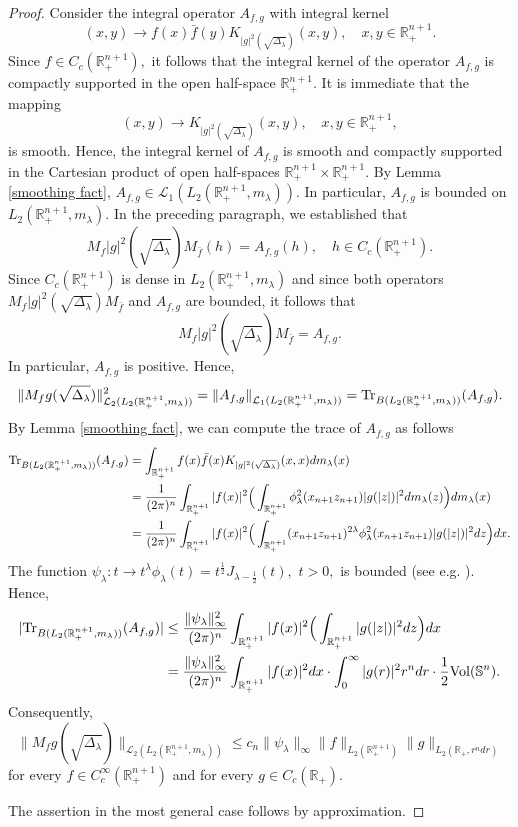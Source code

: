 \documentclass{amsart}
\begin{document}
\begin{proof}
Consider the integral operator $A_{f,g}$ with integral kernel
$$(x,y)\to f(x)\bar{f}(y)K_{|g|^2(\sqrt{\Delta_{\lambda}})}(x,y),\quad x,y\in\mathbb{R}^{n+1}_+.$$
Since $f\in C_c(\mathbb{R}^{n+1}_+),$ it follows that the integral kernel of the operator $A_{f,g}$ is compactly supported in the open half-space $\mathbb{R}^{n+1}_+.$ It is immediate that the mapping
$$(x,y)\to K_{|g|^2(\sqrt{\Delta_{\lambda}})}(x,y),\quad x,y\in\mathbb{R}^{n+1}_+,$$
is smooth. Hence, the integral kernel of $A_{f,g}$ is smooth and compactly supported in the Cartesian product of open half-spaces $\mathbb{R}^{n+1}_+\times\mathbb{R}^{n+1}_+.$ By Lemma \ref{smoothing fact}, $A_{f,g}\in\mathcal{L}_1(L_2(\mathbb{R}^{n+1}_+,m_{\lambda})).$ In particular, $A_{f,g}$ is bounded on $L_2(\mathbb{R}^{n+1}_+,m_{\lambda}).$ In the preceding paragraph, we established that
$$M_f|g|^2(\sqrt{\Delta_{\lambda}})M_{\bar{f}}(h)=A_{f,g}(h),\quad h\in C_c(\mathbb{R}_+^{n+1}).$$
Since $C_c(\mathbb{R}_+^{n+1})$ is dense in $L_2(\mathbb{R}^{n+1}_+,m_{\lambda})$ and since both operators $M_f|g|^2(\sqrt{\Delta_{\lambda}})M_{\bar{f}}$ and $A_{f,g}$ are bounded, it follows that
$$M_f|g|^2(\sqrt{\Delta_{\lambda}})M_{\bar{f}}=A_{f,g}.$$
In particular, $A_{f,g}$ is positive. Hence,
$$\|M_fg(\sqrt{\Delta_{\lambda}})\|_{\mathcal{L}_2(L_2(\mathbb{R}_+^{n+1},m_{\lambda}))}^2=\|A_{f,g}\|_{\mathcal{L}_1(L_2(\mathbb{R}_+^{n+1},m_{\lambda}))}={\rm Tr}_{B(L_2(\mathbb{R}^{n+1}_+,m_{\lambda}))}(A_{f,g}).$$
By Lemma \ref{smoothing fact}, we can compute the trace of $A_{f,g}$ as follows
\begin{align*}
{\rm Tr}_{B(L_2(\mathbb{R}^{n+1}_+,m_{\lambda}))}(A_{f,g})&=\int_{\mathbb{R}_+^{n+1}}f(x)\bar{f}(x)K_{|g|^2(\sqrt{\Delta_{\lambda}})}(x,x)dm_{\lambda}(x)\\
&=\frac{1}{(2\pi)^n}\int_{\mathbb{R}_+^{n+1}}|f(x)|^2\Big(\int_{\mathbb{R}_+^{n+1}}\phi_{\lambda}^2(x_{n+1}z_{n+1})|g(|z|)|^2dm_{\lambda}(z)\Big)dm_{\lambda}(x)\\
&=\frac{1}{(2\pi)^n}\int_{\mathbb{R}_+^{n+1}}|f(x)|^2\Big(\int_{\mathbb{R}_+^{n+1}}(x_{n+1}z_{n+1})^{2\lambda}\phi_{\lambda}^2(x_{n+1}z_{n+1})|g(|z|)|^2dz\Big)dx.
\end{align*}
The function $\psi_{\lambda}:t\to t^{\lambda}\phi_{\lambda}(t)=t^{\frac12}J_{\lambda-\frac12}(t),$ $t>0,$ is bounded (see e.g. \cite[p.364]{MR167642}). Hence,
\begin{align*}
|{\rm Tr}_{B(L_2(\mathbb{R}^{n+1}_+,m_{\lambda}))}(A_{f,g})|&\leq\frac{\|\psi_{\lambda}\|_{\infty}^2}{(2\pi)^n}\int_{\mathbb{R}_+^{n+1}}|f(x)|^2\Big(\int_{\mathbb{R}_+^{n+1}}|g(|z|)|^2dz\Big)dx\\
&=\frac{\|\psi_{\lambda}\|_{\infty}^2}{(2\pi)^n}\int_{\mathbb{R}_+^{n+1}}|f(x)|^2dx\cdot\int_0^{\infty}|g(r)|^2r^ndr\cdot\frac12{\rm Vol}(\mathbb{S}^n).
\end{align*}
Consequently,
$$\|M_fg(\sqrt{\Delta_{\lambda}})\|_{\mathcal{L}_2(L_2(\mathbb{R}_+^{n+1},m_{\lambda}))}\leq c_n\|\psi_{\lambda}\|_{\infty}\|f\|_{L_2(\mathbb{R}_+^{n+1})}\|g\|_{L_2(\mathbb{R}_+,r^ndr)}$$
for every $f\in C_c^{\infty}(\mathbb{R}^{n+1}_+)$ and for every $g\in C_c(\mathbb{R}_+).$

The assertion in the most general case follows by approximation.
\end{proof}
\end{document}
